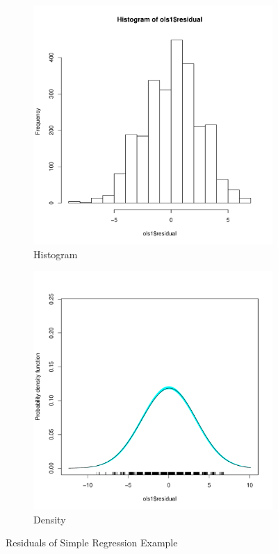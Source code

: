 \documentclass[11pt,openany]{book}\usepackage[]{graphicx}\usepackage[]{color}
\begin{document}
\begin{figure}
        \centering
        \begin{subfigure}[b]{0.4\textwidth}
                \centering
                \includegraphics[width=\textwidth]{07_OLSlogic/exresidhist.pdf}%
                \caption{Histogram}
        \end{subfigure}
        \begin{subfigure}[b]{0.4\textwidth}
                \centering
                \includegraphics[width=\textwidth]{07_OLSlogic/exresidden.pdf}%
                \caption{Density}
        \end{subfigure}
        \caption{Residuals of Simple Regression Example \label{fig:resid}} 
\end{figure}        
\FloatBarrier
\end{document}
